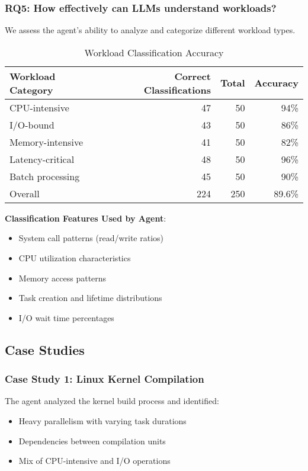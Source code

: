 \subsubsection{RQ5: How effectively can LLMs understand workloads?}

We assess the agent's ability to analyze and categorize different workload types.

\begin{table}[h]
\caption{Workload Classification Accuracy}
\label{tab:workload-understanding}
\begin{tabular}{lrrr}
\toprule
Workload Category & Correct Classifications & Total & Accuracy \\
\midrule
CPU-intensive & 47 & 50 & 94\% \\
I/O-bound & 43 & 50 & 86\% \\
Memory-intensive & 41 & 50 & 82\% \\
Latency-critical & 48 & 50 & 96\% \\
Batch processing & 45 & 50 & 90\% \\
\midrule
Overall & 224 & 250 & 89.6\% \\
\bottomrule
\end{tabular}
\end{table}

\textbf{Classification Features Used by Agent}:
\begin{itemize}
\item System call patterns (read/write ratios)
\item CPU utilization characteristics
\item Memory access patterns
\item Task creation and lifetime distributions
\item I/O wait time percentages
\end{itemize}

\subsection{Case Studies}

\subsubsection{Case Study 1: Linux Kernel Compilation}

The agent analyzed the kernel build process and identified:
\begin{itemize}
\item Heavy parallelism with varying task durations
\item Dependencies between compilation units
\item Mix of CPU-intensive and I/O operations
\end{itemize}

